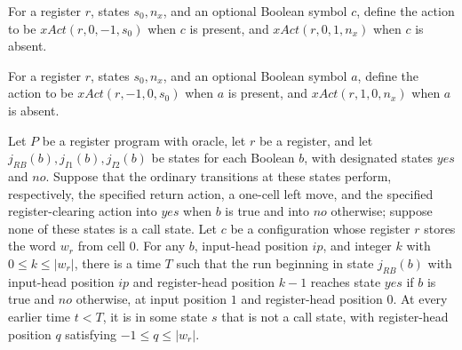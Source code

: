 \begin{definition}
\label{Complexity.LogProg.backAct}
\leanok
{}
For a register $r$, states $s_0,n_x$, and an optional Boolean symbol $c$, define the
action to be $xAct(r,0,-1,s_0)$ when $c$ is present, and $xAct(r,0,1,n_x)$ when $c$ is
absent.
\end{definition}

\begin{definition}
\label{Complexity.LogProg.rewAct}
\leanok
{}
For a register $r$, states $s_0,n_x$, and an optional Boolean symbol $a$, define the
action to be $xAct(r,-1,0,s_0)$ when $a$ is present, and $xAct(r,1,0,n_x)$ when $a$ is
absent.
\end{definition}

\begin{lemma}
\label{Complexity.LogProg.cmpReturn}
\leanok
{}
Let $P$ be a register program with oracle, let $r$ be a register, and let
$j_{RB}(b),j_{I1}(b),j_{I2}(b)$ be states for each Boolean $b$, with designated states
$yes$ and $no$. Suppose that the ordinary transitions at these states perform,
respectively, the specified return action, a one-cell left move, and the specified
register-clearing action into $yes$ when $b$ is true and into $no$ otherwise; suppose
none of these states is a call state. Let $c$ be a configuration whose register $r$
stores the word $w_r$ from cell $0$. For any $b$, input-head position $ip$, and integer
$k$ with $0\le k\le |w_r|$, there is a time $T$ such that the run beginning in state
$j_{RB}(b)$ with input-head position $ip$ and register-head position $k-1$ reaches state
$yes$ if $b$ is true and $no$ otherwise, at input position $1$ and register-head
position $0$. At every earlier time $t<T$, it is in some state $s$ that is not a call
state, with register-head position $q$ satisfying $-1\le q\le |w_r|$.
\end{lemma}

